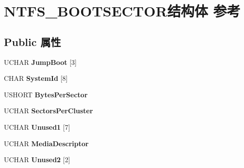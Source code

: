 \hypertarget{struct_n_t_f_s___b_o_o_t_s_e_c_t_o_r}{}\section{N\+T\+F\+S\+\_\+\+B\+O\+O\+T\+S\+E\+C\+T\+O\+R结构体 参考}
\label{struct_n_t_f_s___b_o_o_t_s_e_c_t_o_r}
\subsection*{Public 属性}
\begin{DoxyCompactItemize}
\item 
\mbox{\label{struct_n_t_f_s___b_o_o_t_s_e_c_t_o_r_aec77d414ac087779e25f9a0e931f6472}} 
U\+C\+H\+AR {\bfseries Jump\+Boot} \mbox{[}3\mbox{]}
\item 
\mbox{\label{struct_n_t_f_s___b_o_o_t_s_e_c_t_o_r_abe6f310bac6208af2bb52e4c3dd77e2b}} 
C\+H\+AR {\bfseries System\+Id} \mbox{[}8\mbox{]}
\item 
\mbox{\label{struct_n_t_f_s___b_o_o_t_s_e_c_t_o_r_a4ab7cbf0007c8b9e6a36ed78c5453500}} 
U\+S\+H\+O\+RT {\bfseries Bytes\+Per\+Sector}
\item 
\mbox{\label{struct_n_t_f_s___b_o_o_t_s_e_c_t_o_r_a95ddbcff3cd333c6759ea8182dbca03d}} 
U\+C\+H\+AR {\bfseries Sectors\+Per\+Cluster}
\item 
\mbox{\label{struct_n_t_f_s___b_o_o_t_s_e_c_t_o_r_a82cb54d9253b0ad1eb9e72471b8500fe}} 
U\+C\+H\+AR {\bfseries Unused1} \mbox{[}7\mbox{]}
\item 
\mbox{\label{struct_n_t_f_s___b_o_o_t_s_e_c_t_o_r_adbb8aedfed3fbe858a45a63c7ddb1d85}} 
U\+C\+H\+AR {\bfseries Media\+Descriptor}
\item 
\mbox{\label{struct_n_t_f_s___b_o_o_t_s_e_c_t_o_r_a6b750b70ecb702516fd3b7ef8efaa68c}} 
U\+C\+H\+AR {\bfseries Unused2} \mbox{[}2\mbox{]}
\item 
\mbox{\label{struct_n_t_f_s___b_o_o_t_s_e_c_t_o_r_ad1840f6fedbfb6662f9480f860e5818b}} 

\end{DoxyCompactItemize}
